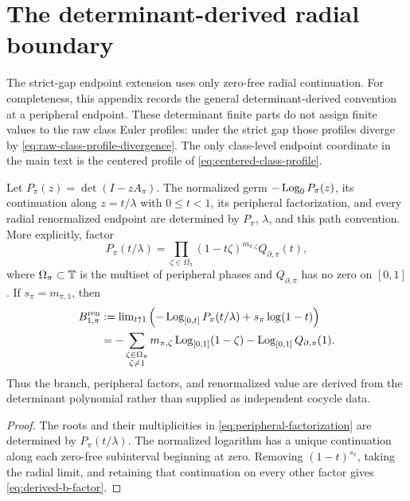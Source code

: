 \section{The determinant-derived radial boundary}
\label{app:radial-boundary}

The strict-gap endpoint extension uses only zero-free radial continuation.  For
completeness, this appendix records the general determinant-derived convention
at a peripheral endpoint.  These determinant finite parts do not assign
finite values to the raw class Euler profiles: under the strict gap those
profiles diverge by \eqref{eq:raw-class-profile-divergence}.  The only
class-level endpoint coordinate in the main text is the centered profile of
\eqref{eq:centered-class-profile}.

\begin{proposition}
\label{prop:derived-boundary}
Let \(P_\pi(z)=\det(I-zA_\pi)\).  The normalized germ
\(-\operatorname{Log}_0P_\pi(z)\), its continuation along \(z=t/\lambda\) with
\(0\leq t<1\), its peripheral factorization, and every radial renormalized
endpoint are determined by \(P_\pi\), \(\lambda\), and this path convention.
More explicitly, factor
\begin{equation}\label{eq:peripheral-factorization}
  P_\pi(t/\lambda)
   =\prod_{\zeta\in\Omega_\pi}(1-t\zeta)^{m_{\pi,\zeta}}
      Q_{\partial,\pi}(t),
\end{equation}
where \(\Omega_\pi\subset\mathbb{T}\) is the multiset of peripheral phases and
\(Q_{\partial,\pi}\) has no zero on \([0,1]\).  If
\(s_\pi=m_{\pi,1}\), then
\begin{align}
  B_{1,\pi}^{\mathrm{ren}}
  &:={\lim}_{t\uparrow1}
     \left(-\operatorname{Log}_{[0,t]}P_\pi(t/\lambda)+s_\pi\log(1-t)\right)
     \label{eq:derived-b-ren}\\
  &=-\sum_{\substack{\zeta\in\Omega_\pi\\\zeta\neq1}}
       m_{\pi,\zeta}\operatorname{Log}_{[0,1]}(1-\zeta)
     -\operatorname{Log}_{[0,1]}Q_{\partial,\pi}(1).
     \label{eq:derived-b-factor}
\end{align}
Thus the branch, peripheral factors, and renormalized value are derived from
the determinant polynomial rather than supplied as independent cocycle data.
\end{proposition}

\begin{proof}
The roots and their multiplicities in \eqref{eq:peripheral-factorization}
are determined by \(P_\pi(t/\lambda)\).  The normalized logarithm has a unique
continuation along each zero-free subinterval beginning at zero.  Removing
\((1-t)^{s_\pi}\), taking the radial limit, and retaining that continuation
on every other factor gives \eqref{eq:derived-b-factor}.
\end{proof}
